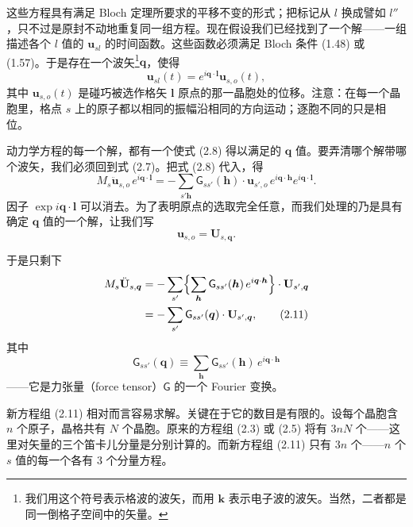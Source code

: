 这些方程具有满足 Bloch 定理所要求的平移不变的形式；把标记从 $l$ 换成譬如 $l''$，只不过是原封不动地重复同一组方程。现在假设我们已经找到了一个解——一组描述各个 $l$ 值的 $\mathbf{u}_{sl}$ 的时间函数。这些函数必须满足 Bloch 条件 (1.48) 或 (1.57)。于是存在一个波矢\footnote{我们用这个符号表示格波的波矢，而用 $\boldsymbol{k}$ 表示电子波的波矢。当然，二者都是同一倒格子空间中的矢量。}$\boldsymbol{q}$，使得
\begin{equation*}
\mathbf{u}_{sl}(t) = e^{i\boldsymbol{q}\cdot\boldsymbol{l}} \mathbf{u}_{s,o}(t),
\tag{2.8}
\end{equation*}
其中 $\mathbf{u}_{s,o}(t)$ 是碰巧被选作格矢 $\boldsymbol{l}$ 原点的那一晶胞处的位移。注意：在每一个晶胞里，格点 $s$ 上的原子都以相同的振幅沿相同的方向运动；逐胞不同的只是相位。

动力学方程的每一个解，都有一个使式 (2.8) 得以满足的 $\boldsymbol{q}$ 值。要弄清哪个解带哪个波矢，我们必须回到式 (2.7)。把式 (2.8) 代入，得
\begin{equation*}
M_s \ddot{\mathbf{u}}_{s,o}\, e^{i\boldsymbol{q}\cdot\boldsymbol{l}} = - \sum_{s'\boldsymbol{h}} \mathsf{G}_{ss'}(\boldsymbol{h}) \cdot \mathbf{u}_{s',o}\, e^{i\boldsymbol{q}\cdot\boldsymbol{h}} e^{i\boldsymbol{q}\cdot\boldsymbol{l}}.
\tag{2.9}
\end{equation*}
因子 $\exp i\boldsymbol{q}\cdot\boldsymbol{l}$ 可以消去。为了表明原点的选取完全任意，而我们处理的乃是具有确定 $\boldsymbol{q}$ 值的一个解，让我们写
\begin{equation*}
\mathbf{u}_{s,o} = \mathbf{U}_{s,\boldsymbol{q}}.
\tag{2.10}
\end{equation*}

于是只剩下
\begin{align*}
M_s \ddot{\mathbf{U}}_{s,\boldsymbol{q}} &= - \sum_{s'} \Bigl\{ \sum_{\boldsymbol{h}} \mathsf{G}_{ss'}(\boldsymbol{h})\, e^{i\boldsymbol{q}\cdot\boldsymbol{h}} \Bigr\} \cdot \mathbf{U}_{s',\boldsymbol{q}} \\
&= - \sum_{s'} \mathsf{G}_{ss'}(\boldsymbol{q}) \cdot \mathbf{U}_{s',\boldsymbol{q}},
\tag{2.11}
\end{align*}
其中
\begin{equation*}
\mathsf{G}_{ss'}(\boldsymbol{q}) \equiv \sum_{\boldsymbol{h}} \mathsf{G}_{ss'}(\boldsymbol{h})\, e^{i\boldsymbol{q}\cdot\boldsymbol{h}}
\tag{2.12}
\end{equation*}
——它是力张量（force tensor）$\mathsf{G}$ 的一个 Fourier 变换。

新方程组 (2.11) 相对而言容易求解。关键在于它的数目是有限的。设每个晶胞含 $n$ 个原子，晶格共有 $N$ 个晶胞。原来的方程组 (2.3) 或 (2.5) 将有 $3nN$ 个——这里对矢量的三个笛卡儿分量是分别计算的。而新方程组 (2.11) 只有 $3n$ 个——$n$ 个 $s$ 值的每一个各有 3 个分量方程。

